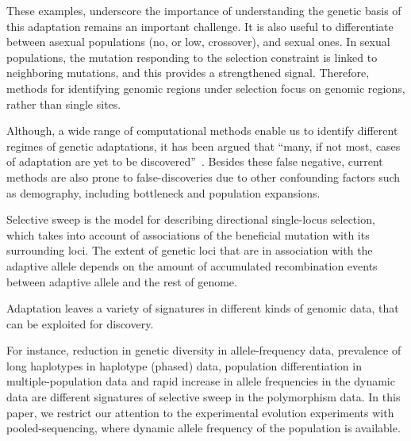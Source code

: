 \documentclass[11pt]{article}
\begin{document}
These examples, underscore the importance of understanding the genetic
basis of this adaptation remains an important challenge. It is also
useful to differentiate between asexual populations (no, or low,
crossover), and sexual ones. In sexual populations, the mutation
responding to the selection constraint is linked to neighboring
mutations, and this provides a strengthened signal. Therefore, methods
for identifying genomic regions under selection focus on genomic
regions, rather than single sites.



Although, a wide range of computational methods
\cite{vitti2013detecting} enable us to identify different regimes of
genetic adaptations, it has been argued that ``many, if not most,
cases of adaptation are yet to be
discovered''~\cite{messer2013population}. Besides these false
negative, current methods are also prone to false-discoveries due to
other confounding factors such as demography, including bottleneck and
population expansions.



Selective sweep \cite{smith1974hitch,kaplan1989hitchhiking} is the
model for describing directional single-locus selection, which takes
into account of associations of the beneficial mutation with its
surrounding loci.  The extent of genetic loci that are in association
with the adaptive allele depends on the amount of accumulated
recombination events between adaptive allele and the rest of genome.




Adaptation leaves a variety of signatures in different kinds of
genomic data, that can be exploited for discovery. 


For instance, reduction in genetic
diversity\cite{tajima1989statistical,fay2000hitchhiking,ronen2013learning}
in allele-frequency data, prevalence of long haplotypes
\cite{sabeti2006positive,vitti2013detecting} in haplotype (phased)
data, population differentiation
\cite{holsinger2009genetics,burke2010genome} in multiple-population
data and rapid increase in allele frequencies
\cite{bergland2014genomic} in the dynamic data are different
signatures of selective sweep in the polymorphism data.  In this
paper, we restrict our attention to the experimental evolution
experiments with pooled-sequencing, where dynamic allele frequency of
the population is available.
\end{document}

